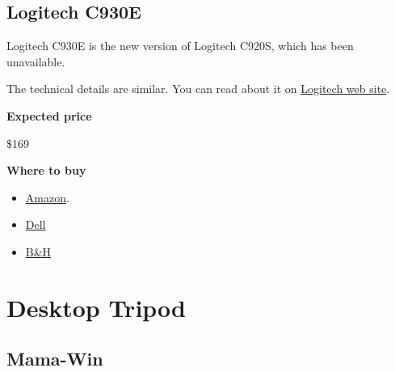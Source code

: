 \subsection{Logitech C930E}
\label{sec:logitech::930}
\begin{gram}
\label{grm:logitech::930::main}
Logitech C930E is the new version of Logitech C920S, which has been unavailable.

The technical details are similar.  You can read about it on
%
\href{https://www.logitech.com/en-us/product/c930e-webcam}{Logitech web site}.

\textbf{Expected price}

\$169

\textbf{Where to buy}

\begin{itemize}
\item
\href{https://www.amazon.com/Logitech-C930e-1080P-Video-Webcam/dp/B00CRJWW2G}{Amazon}.
\item 
\href{https://www.dell.com/en-ca/work/shop/logitech-c930e-hd-webcam/apd/a6880908/pc-accessories}{Dell}
\item
\href{https://www.bhphotovideo.com/c/product/977620-REG/logitech_960_000971_c930e_webcam_usb.html}{B\&H}
\end{itemize}

\end{gram}

\section{Desktop Tripod}
\label{sec:tripod}

\subsection{Mama-Win}
\label{sec:tripod::mamawin}

